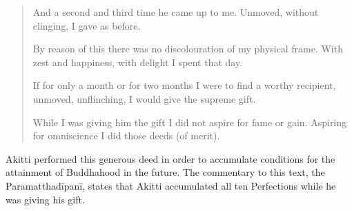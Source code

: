 \documentclass{book}
\begin{document}
\begin{quote}
And a second and third time he came up to me. Unmoved, without clinging,
I gave as before.

By reason of this there was no discolouration of my physical frame. With
zest and happiness, with delight I spent that day.

If for only a month or for two months I were to find a worthy recipient,
unmoved, unflinching, I would give the supreme gift.

While I was giving him the gift I did not aspire for fame or gain.
Aspiring for omniscience I did those deeds (of merit).
\end{quote}

Akitti performed this generous deed in order to accu­mulate conditions
for the attainment of Buddhahood in the future. The commentary to this
text, the Paramattha­dīpanī, states that Akitti accumulated all ten
Perfections while he was giving his gift.
\end{document}
